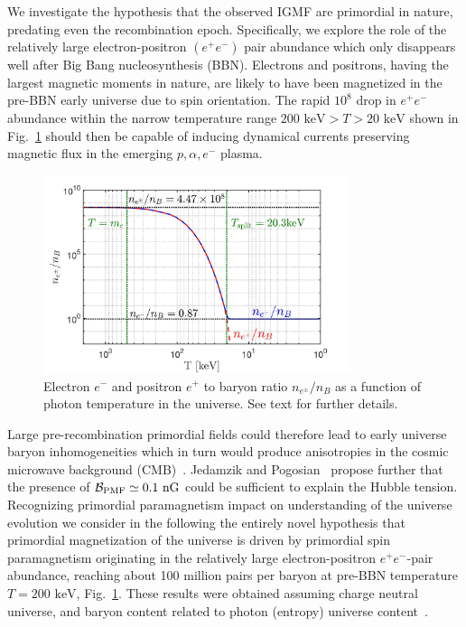 \documentclass[a4paper]{article}
\newcommand*{\keV}{\text{ keV}}
\newcommand{\rf}[1]{Fig.~{\ref{#1}}}
\newcommand*{\xblue}{\color{blue}}
\begin{document}
We investigate the hypothesis that the observed  IGMF  are primordial in nature, predating even the recombination epoch. Specifically, we explore the role of the relatively large electron-positron $(e^{+}e^{-})$ pair abundance which only disappears well after Big Bang nucleosynthesis (BBN). {\xblue Electrons and positrons, having the largest magnetic moments in nature, are likely to have been magnetized in the pre-BBN early universe due to spin orientation. The rapid $10^{8}$ drop in $e^{+}e^{-}$ abundance within the narrow temperature range $200\keV>T>20\keV$ shown in \rf{fig:densityratio} should then be capable of inducing dynamical currents preserving magnetic flux} in the emerging $p,\alpha,e^-$ plasma.  
\begin{figure}[h]
    \centering
    \includegraphics[width=0.8\textwidth]{EEPlasmaDensityRatio_new.jpg}
    \caption{Electron $e^-$ and positron $e^+$ to baryon ratio $n_{e^{\pm}}/n_{B}$  as a function of photon temperature in the universe. See text for further details.}
    \label{fig:densityratio} 
\end{figure}

Large pre-recombination primordial fields could therefore lead to early universe baryon inhomogeneities which in turn would produce anisotropies in the cosmic microwave background (CMB)~\cite{jedamzik2013smallscale}.  Jedamzik and Pogosian~\cite{jedamzik2020relieving} propose further that the presence of ${\cal B}_{\rm PMF}\simeq0.1{\rm\ nG}$ could be sufficient to explain the Hubble tension.  Recognizing primordial paramagnetism impact on understanding of the universe evolution we consider in the following the entirely novel hypothesis that primordial magnetization of the universe is driven by primordial spin paramagnetism originating in the relatively large electron-positron  $e^{+}e^{-}$-pair abundance, reaching about 100 million pairs per baryon at pre-BBN temperature $T=200\keV$,  \rf{fig:densityratio}. These results were  obtained assuming charge neutral universe, and baryon content related to photon (entropy) universe content~\cite{rafelski2023short}. 
\end{document}
